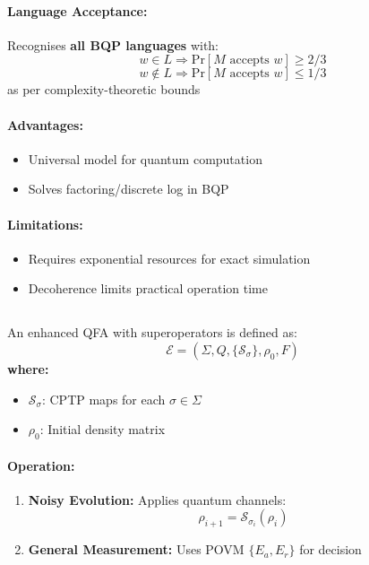 \paragraph{Language Acceptance:}
Recognises \textbf{all BQP languages} \cite{shor1994algorithms} with:
\[
w \in L \Rightarrow \text{Pr}[M \text{ accepts } w] \geq 2/3
\]
\[
w \notin L \Rightarrow \text{Pr}[M \text{ accepts } w] \leq 1/3
\]
as per complexity-theoretic bounds \cite{nielsen2010quantum}

\paragraph{Advantages:}
\begin{itemize}
    \item Universal model for quantum computation
    \item Solves factoring/discrete log in BQP
\end{itemize}

\paragraph{Limitations:}
\begin{itemize}
    \item Requires exponential resources for exact simulation
    \item Decoherence limits practical operation time
\end{itemize}

\subsection{}
\label{subsec:eqfa}

\begin{definition}
An enhanced QFA with superoperators is defined as:
\[
\mathcal{E} = (\Sigma, Q, \{\mathcal{S}_\sigma\}, \rho_0, F)
\]
\textbf{where:}
\begin{itemize}
    \item $\mathcal{S}_\sigma$: CPTP maps for each $\sigma \in \Sigma$
    \item $\rho_0$: Initial density matrix
\end{itemize}
\end{definition}

\paragraph{Operation:}
\begin{enumerate}
    \item \textbf{Noisy Evolution:} Applies quantum channels:
    \[
    \rho_{i+1} = \mathcal{S}_{\sigma_i}(\rho_i)
    \]
    \item \textbf{General Measurement:} Uses POVM $\{E_a, E_r\}$ for decision
\end{enumerate}

